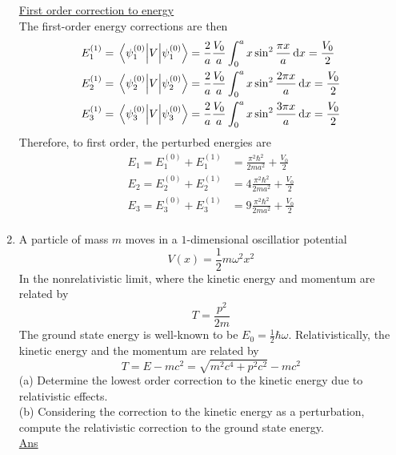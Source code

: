 \begin{enumerate}
			\underline{First order correction to energy}\\
			The first-order energy corrections are then
			\begin{align*}
				E_1^{(1)} = \expval{V}{\psi_1^{(0)}} &= \frac{2}{a} \frac{V_0}{a} \int_{0}^{a} x \sin^2 \frac{\pi x}{a} \dd{x} = \frac{V_0}{2} \\
				E_2^{(1)} = \expval{V}{\psi_2^{(0)}} &= \frac{2}{a} \frac{V_0}{a} \int_{0}^{a} x \sin^2 \frac{2\pi x}{a} \dd{x} = \frac{V_0}{2} \\
				E_3^{(1)} = \expval{V}{\psi_3^{(0)}} &= \frac{2}{a} \frac{V_0}{a} \int_{0}^{a} x \sin^2 \frac{3\pi x}{a} \dd{x} = \frac{V_0}{2} \\
			\end{align*}
			Therefore, to first order, the perturbed energies are
			\begin{align}
				E_1 = E_1^{(0)} + E_1^{(1)} &= \frac{\pi^2 \hbar^2}{2 m a^2} + \frac{V_0}{2} \\
				E_2 = E_2^{(0)} + E_2^{(1)} &= 4\frac{\pi^2 \hbar^2}{2 m a^2} + \frac{V_0}{2} \\
				E_3 = E_3^{(0)} + E_3^{(1)} &= 9\frac{\pi^2 \hbar^2}{2 m a^2} + \frac{V_0}{2} \\
			\end{align}
			
			
			\item 
			A particle of mass $m$ moves in a $1$-dimensional oscillatior potential
			\begin{equation}
				V(x) = \frac{1}{2} m \omega^2 x^2
			\end{equation}
			In the nonrelativistic limit, where the kinetic energy and momentum are related by
			\begin{equation}
				T = \frac{p^2}{2 m}
			\end{equation}
			The ground state energy is well-known to be $E_0=\frac{1}{2} \hbar \omega$. Relativistically, the kinetic energy and the momentum are related by
			\begin{equation}
				T = E - m c^2 = \sqrt{m^2 c^4 + p^2 c^2} - m c^2
			\end{equation}
			(a) Determine the lowest order correction to the kinetic energy due to relativistic effects.\\
			(b) Considering the correction to the kinetic energy as a perturbation, compute the relativistic correction to the ground state energy.\\
			
			\underline{Ans}\\
			
			
			
			
			
		\end{enumerate}
	
	


